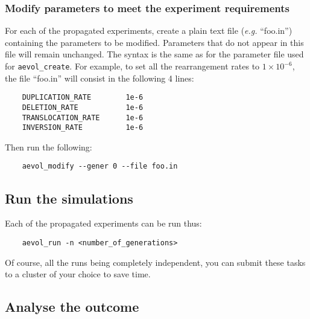 \subsubsection{Modify parameters to meet the experiment requirements}
For each of the propagated experiments, create a plain text file (\emph{e.g.} ``foo.in'') containing the parameters to be modified. Parameters that do not appear in this file will remain unchanged. The syntax is the same as for the parameter file used for \verb?aevol_create?. For example, to set all the rearrangement rates to $1\times10^{-6}$, the file ``foo.in'' will consist in the following 4 lines:
\begin{verbatim}
    DUPLICATION_RATE        1e-6
    DELETION_RATE           1e-6
    TRANSLOCATION_RATE      1e-6
    INVERSION_RATE          1e-6
\end{verbatim}
Then run the following:
\begin{verbatim}
	aevol_modify --gener 0 --file foo.in
\end{verbatim}



\subsection{Run the simulations}
Each of the propagated experiments can be run thus:
\begin{verbatim}
	aevol_run -n <number_of_generations>
\end{verbatim}
Of course, all the runs being completely independent, you can submit these tasks to a cluster of your choice to save time.


\subsection{Analyse the outcome}


\clearemptydoublepage







